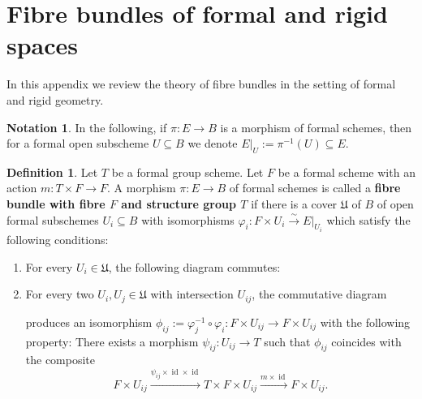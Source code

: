 \documentclass[10pt,oneside]{amsart}
\theoremstyle{definition}
\newtheorem{definition}[theorem]{Definition}
\newtheorem{notation}[theorem]{Notation}
\begin{document}
	
		\appendix
	\section{Fibre bundles of formal and rigid spaces}
	In this appendix we review the theory of fibre bundles in the setting of formal and rigid geometry.

	\begin{notation}
		In the following, if $\pi\colon E\rightarrow B$ is a morphism of formal schemes, then for a formal open subscheme $U\subseteq B$ we denote $E|_U:=\pi^{-1}(U)\subseteq E$.
	\end{notation}
	\begin{definition}\label{definition principal T-bundle}
		Let $T$ be a formal group scheme. Let $F$ be a formal scheme with an action $m\colon T\times F\rightarrow F$.
		A morphism $\pi\colon E\rightarrow B$ of formal schemes is called a \textbf{fibre bundle with fibre $F$ and structure group $T$} if there is a cover $\mathfrak U$ of $B$ of open formal subschemes $U_i\subseteq B$ with isomorphisms $\varphi_i:F\times U_i \xrightarrow{\sim} E|_{U_i}$ which satisfy the following conditions:
		\begin{enumerate}[label=(\alph*)]
			\item For every $U_i\in \mathfrak U$, the following diagram commutes:
			\begin{center}
			\end{center}
			\item For every two $U_i,U_j\in \mathfrak U$ with intersection $U_{ij}$, the commutative diagram
			\begin{center}
			\end{center}
			produces an isomorphism $\phi_{ij}:=\varphi_j^{-1}\circ\varphi_i\colon F\times U_{ij}\rightarrow F\times U_{ij}$ with the following property: There exists a morphism $\psi_{ij}:U_{ij}\rightarrow T$ such that $\phi_{ij}$ coincides with the composite
			\[F\times U_{ij} \xrightarrow{\psi_{ij}\times \operatorname{id}\times\operatorname{id}} T\times F\times U_{ij}\xrightarrow{m\times \operatorname{id}} F\times U_{ij}.\]
		\end{enumerate}
	\end{definition}
\end{document}
